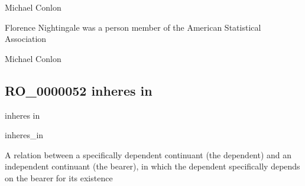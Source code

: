\documentclass[letterpaper,10pt,english]{sphinxmanual}
\begin{document}
\begin{sphinxShadowBox}

\sphinxAtStartPar
Michael Conlon 
\end{sphinxShadowBox}

\begin{sphinxShadowBox}

\sphinxAtStartPar
Florence Nightingale was a person member of the American Statistical Association
\end{sphinxShadowBox}

\begin{sphinxShadowBox}

\sphinxAtStartPar
Michael Conlon 
\end{sphinxShadowBox}
\begin{quote}

\ignorespaces \end{quote}


\subsection{RO\_0000052 \sphinxhyphen{} inheres in}
\label{\detokenize{doc-RO_0000052:ro-0000052-inheres-in}}\label{\detokenize{doc-RO_0000052:index-0}}\label{\detokenize{doc-RO_0000052::doc}}
\begin{sphinxShadowBox}

\sphinxAtStartPar
inheres in
\end{sphinxShadowBox}

\begin{sphinxShadowBox}

\sphinxAtStartPar
inheres\_in
\end{sphinxShadowBox}

\begin{sphinxShadowBox}

\sphinxAtStartPar
A relation between a specifically dependent continuant (the dependent) and an independent continuant (the bearer), in which the dependent specifically depends on the bearer for its existence
\end{sphinxShadowBox}
\end{document}
